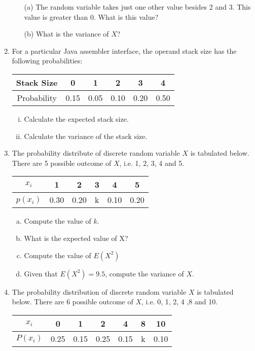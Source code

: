 \documentclass[a4paper,12pt]{article}
\begin{document}
\begin{enumerate}
\begin{itemize}
	\item[(a)] The random variable takes just one other value besides 2 and 3. This value is greater than 0. What is this value?
	\item[(b)] What is the variance of $X$?
\end{itemize}
		\item 
		For a particular Java assembler interface, the operand stack size has the
		following probabilities:
		\begin{center}
			\begin{tabular}{|c||c|c|c|c|c|}
				\hline
				Stack Size  & 0 & 1 & 2 & 3 & 4 \\ \hline
				Probability & 0.15 & 0.05 & 0.10 &0.20 &0.50\\
				\hline
			\end{tabular}
		\end{center}
		
		
		\begin{enumerate}[(i)]
			
			\item Calculate the expected stack size.
			\item Calculate the variance of the stack size.
			
	\end{enumerate}
	
\item The probability distribute of discrete random variable $X$ is tabulated below. There are 5 possible outcome of $X$, i.e. 1, 2, 3, 4 and 5.
\begin{center}
	\begin{tabular}{|c||c|c|c|c|c|}
		\hline
		$x_i$  & 1 & 2 & 3 & 4 & 5  \\\hline
		$p(x_i)$ & 0.30 & 0.20 & k & 0.10 & 0.20 \\
		\hline
	\end{tabular}
\end{center}

\begin{enumerate}[(a)]
	\item Compute the value of $k$.
	\item What is the expected value of X?
	\item Compute the value of $E(X^2)$
	\item Given that $E(X^2) = 9.5$, compute the variance of $X$.
\end{enumerate}
		\item  The probability distribution of discrete random variable $X$ is tabulated below. There are 6 possible outcome of $X$, i.e. 0, 1, 2, 4 ,8 and 10.
		\begin{center}
			\begin{tabular}{|c||c|c|c|c|c|c|}
				\hline
				$x_i$  & 0 & 1 & 2 & 4 & 8 & 10 \\\hline
				$P(x_i)$ & 0.25 & 0.15 & 0.25 & 0.15 & k & 0.10\\
				\hline
			\end{tabular}
		\end{center}
		

\end{enumerate}
\end{document}
